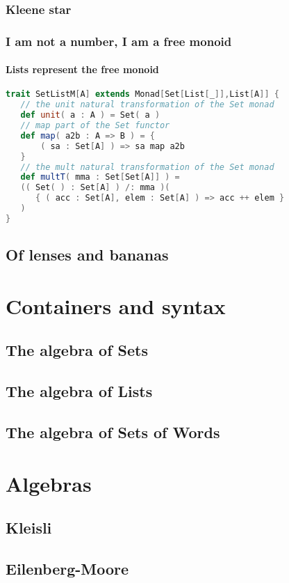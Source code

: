 \subsubsection{Kleene star}

\subsubsection{I am not a number, I am a free monoid}

\paragraph{Lists represent the free monoid}

\begin{lstlisting}[language=Scala,mathescape=true]
trait SetListM[A] extends Monad[Set[List[_]],List[A]] {
   // the unit natural transformation of the Set monad
   def unit( a : A ) = Set( a )
   // map part of the Set functor
   def map( a2b : A => B ) = {
       ( sa : Set[A] ) => sa map a2b
   }
   // the mult natural transformation of the Set monad
   def multT( mma : Set[Set[A]] ) =
   (( Set( ) : Set[A] ) /: mma )(
      { ( acc : Set[A], elem : Set[A] ) => acc ++ elem }
   )
}
\end{lstlisting}

\subsection{Of lenses and bananas}

\section{Containers and syntax}

\subsection{The algebra of Sets}

\subsection{The algebra of Lists}

\subsection{The algebra of Sets of Words}

\section{Algebras}

\subsection{Kleisli}

\subsection{Eilenberg-Moore}